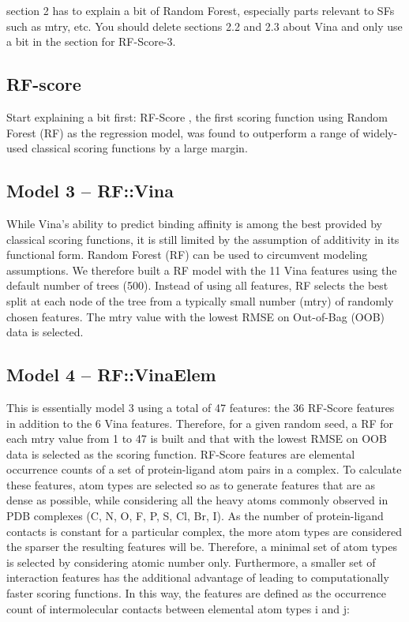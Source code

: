 \documentclass{llncs}
\begin{document}
section 2 has to explain a bit of Random Forest, especially parts relevant to SFs such as mtry, etc. You should delete sections 2.2 and 2.3 about Vina and only use a bit in the section for RF-Score-3.

\subsection{RF-score}

Start explaining a bit first: RF-Score \cite{564}, the first scoring function using Random Forest (RF) \cite{1309} as the regression model, was found to outperform a range of widely-used classical scoring functions by a large margin.

\subsection{Model 3 – RF::Vina}

While Vina’s ability to predict binding affinity is among the best provided by classical scoring functions, it is still limited by the assumption of additivity in its functional form. Random Forest (RF) \cite{1309} can be used to circumvent modeling assumptions. We therefore built a RF model with the 11 Vina features using the default number of trees (500). Instead of using all features, RF selects the best split at each node of the tree from a typically small number (mtry) of randomly chosen features. The mtry value with the lowest RMSE on Out-of-Bag (OOB) data is selected.

\subsection{Model 4 – RF::VinaElem}

This is essentially model 3 using a total of 47 features: the 36 RF-Score features \cite{564} in addition to the 6 Vina features. Therefore, for a given random seed, a RF for each mtry value from 1 to 47 is built and that with the lowest RMSE on OOB data is selected as the scoring function. RF-Score features are elemental occurrence counts of a set of protein-ligand atom pairs in a complex. To calculate these features, atom types are selected so as to generate features that are as dense as possible, while considering all the heavy atoms commonly observed in PDB complexes (C, N, O, F, P, S, Cl, Br, I). As the number of protein-ligand contacts is constant for a particular complex, the more atom types are considered the sparser the resulting features will be. Therefore, a minimal set of atom types is selected by considering atomic number only. Furthermore, a smaller set of interaction features has the additional advantage of leading to computationally faster scoring functions. In this way, the features are defined as the occurrence count of intermolecular contacts between elemental atom types i and j:
\end{document}
